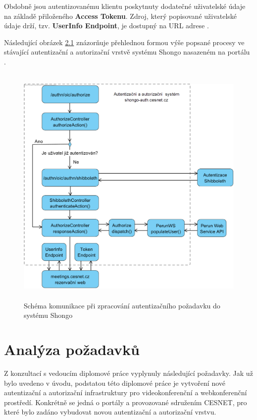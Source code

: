 \documentclass[
  printed, %
  twoside, %
  table,   %
  nolof,     %
  nolot,     %
]{fithesis3}
\begin{document}
Obdobně jsou autentizovanému klientu poskytnuty dodatečné uživatelské údaje na základě přiloženého \textbf{Access Tokenu}. Zdroj, který popisované uživatelské údaje drží, tzv. \textbf{UserInfo Endpoint}, je dostupný na URL adrese .  \par 

Následující obrázek \hyperref[fig:shongoAuthnProcess]{2.1} znázorňuje přehlednou formou výše popsané procesy ve stávající autentizační a autorizační vrstvě systému Shongo nasazeném na portálu . 

\begin{figure}[H]
\caption{Schéma komunikace při zpracování autentizačního požadavku do systému Shongo} 
\centering
\centerline{\includegraphics[width=12.8cm, height=12cm]{pics/shongo-auth-layer-old}} 
\label{fig:shongoAuthnProcess}
\end{figure}
\par 


\section{Analýza požadavků}
Z konzultací s vedoucím diplomové práce vyplynuly následující požadavky. Jak už bylo uvedeno v úvodu, podstatou této diplomové práce je vytvoření nové autentizační a autorizační infrastruktury pro videokonferenční a webkonferenční prostředí. Konkrétně se jedná o portály  a  provozované sdružením CESNET, pro které bylo zadáno vybudovat novou autentizační a autorizační vrstvu. 
\end{document}
